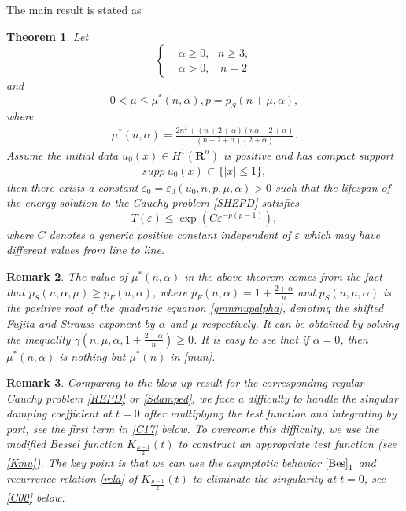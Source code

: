 \documentclass[review]{elsarticle}
\newtheorem{thm}{Theorem}[section]
\newtheorem{rem}[thm]{Remark}
\newcommand{\e}{\varepsilon}
\newcommand{\R}{\mathbf{R}}
\begin{document}
The main result is stated as
\begin{thm}
\label{hddamped}
Let
\begin{equation}
\label{al}
\left\{
\begin{aligned}
& \alpha\ge 0,~~~n\ge 3,\\
& \alpha>0,~~~~n=2
\end{aligned}
\right.
\end{equation}
and
\[
0<\mu\leq\mu^*(n,\alpha), p=p_S(n+\mu, \alpha),
\]
 where
\begin{equation}
\begin{aligned}
\mu^*(n,\alpha)=\frac{2n^2+(n+2+\alpha)(n\alpha+2+\alpha)}{(n+2+\alpha)(2+\alpha)}.
\end{aligned}
\end{equation}
Assume the initial data $u_0(x)\in H^1(\R^n)$ is positive and has compact support
\begin{equation}
\begin{aligned}
supp~u_0(x)\subset\{|x|\le 1\},
\end{aligned}
\end{equation}
then there exists a constant $\e_0=\e_0(u_0,n,p,\mu,\alpha)>0$ such that the lifespan of the energy solution to the Cauchy problem \eqref{SHEPD} satisfies
\begin{equation}
\label{lf2}
T(\e)\le \exp\left(C\e^{-p(p-1)}\right),
\end{equation}
where $C$ denotes a generic positive constant independent of $\e$ which may have different values from line to line.
\end{thm}
\begin{rem}
The value of $\mu^*(n, \alpha)$ in the above theorem comes from the fact that
 $p_{S}(n,\alpha,\mu)\geq p_F(n,\alpha)$, where  $p_F(n,\alpha)=1+\frac{2+\alpha}{n}$
and $p_{S}(n,\mu,\alpha)$ is the positive root of the quadratic equation \eqref{gmnmupalpha}, denoting the shifted Fujita and Strauss exponent by $\alpha$ and $\mu$ respectively. It can be obtained by solving the inequality
 $\gamma(n,\mu,\alpha,1+\frac{2+\alpha}{n})\geq0$. It is easy to see that if  $\alpha=0$, then $\mu^*(n, \alpha)$ is nothing but $\mu^*(n)$ in \eqref{mun}.

\end{rem}

\begin{rem}

Comparing to the blow up result for the corresponding regular Cauchy problem \eqref{REPD} or \eqref{Sdamped}, we face a difficulty to handle the singular damping coefficient at $t=0$ after multiplying the test function and integrating by part, see the first term in \eqref{C17} below. To overcome this difficulty, we use the modified Bessel function $K_{\frac{\mu-1}{2}}(t)$ to construct an appropriate test function (see \eqref{Kmu}). The key point is that we can use the asymptotic behavior $\eqref{Bes}_1$ and recurrence relation \eqref{rela} of $K_{\frac{\mu-1}{2}}(t)$ to eliminate the singularity at $t=0$, see \eqref{C00} below.

\end{rem}
\end{document}
